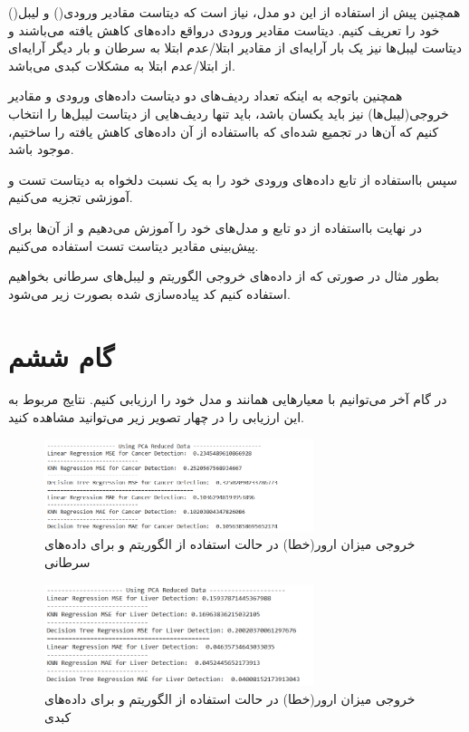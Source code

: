 \documentclass{article}
\begin{document}
همچنین پیش از استفاده از این دو مدل، نیاز است که دیتاست مقادیر ورودی() و لیبل() خود را تعریف کنیم. دیتاست مقادیر ورودی درواقع داده‌های کاهش یافته می‌باشند و دیتاست لیبل‌ها نیز یک بار آرایه‌ای از مقادیر ابتلا/عدم ابتلا به سرطان و بار دیگر آرایه‌ای از ابتلا/عدم ابتلا به مشکلات کبدی می‌باشد.

همچنین باتوجه به اینکه تعداد ردیف‌های دو دیتاست داده‌های ورودی و مقادیر خروجی(لیبل‌ها) نیز باید یکسان باشد، باید تنها ردیف‌هایی از دیتاست لیبل‌ها را انتخاب کنیم که  آن‌ها در  تجمیع شده‌ای که بااستفاده از آن داده‌های کاهش یافته را ساختیم، موجود باشد.

سپس بااستفاده از تابع  داده‌های ورودی خود را به یک نسبت دلخواه به دیتاست تست و آموزشی تجزیه می‌کنیم. 

در نهایت بااستفاده از دو تابع  و  مدل‌های خود را آموزش می‌دهیم و از آن‌ها برای پیش‌بینی مقادیر دیتاست تست استفاده می‌کنیم.

بطور مثال در صورتی که از داده‌های خروجی الگوریتم  و لیبل‌های سرطانی بخواهیم استفاده کنیم کد پیاده‌سازی شده بصورت زیر می‌شود.

\lr{}

\newpage
\section{گام ششم}
در گام آخر می‌توانیم با معیارهایی همانند  و  مدل خود را ارزیابی کنیم. نتایج مربوط به این ارزیابی را در چهار تصویر زیر می‌توانید مشاهده کنید.

\begin{figure}[ht]
        \centering
        \includegraphics[width=0.7\textwidth]{pca-cancer.png}
        \caption{خروجی میزان ارور(خطا) در حالت استفاده از الگوریتم  و برای داده‌های سرطانی}
        \label{fig:fig3}
\end{figure}

\begin{figure}[ht]
        \centering
        \includegraphics[width=0.7\textwidth]{pca-liver.png}
        \caption{خروجی میزان ارور(خطا) در حالت استفاده از الگوریتم  و برای داده‌های کبدی}
        \label{fig:fig4}
\end{figure}
\end{document}

